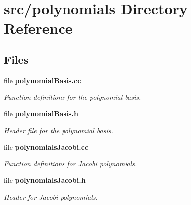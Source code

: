 \section{src/polynomials Directory Reference}
\label{dir_6ecc73a19e66f0c0a887d5d02f1c466a}
\subsection*{Files}
\begin{DoxyCompactItemize}
\item 
file {\bf polynomial\-Basis.\-cc}
\begin{DoxyCompactList}\small\item\em Function definitions for the polynomial basis. \end{DoxyCompactList}\item 
file {\bf polynomial\-Basis.\-h}
\begin{DoxyCompactList}\small\item\em Header file for the polynomial basis. \end{DoxyCompactList}\item 
file {\bf polynomials\-Jacobi.\-cc}
\begin{DoxyCompactList}\small\item\em Function definitions for Jacobi polynomials. \end{DoxyCompactList}\item 
file {\bf polynomials\-Jacobi.\-h}
\begin{DoxyCompactList}\small\item\em Header for Jacobi polynomials. \end{DoxyCompactList}\end{DoxyCompactItemize}
